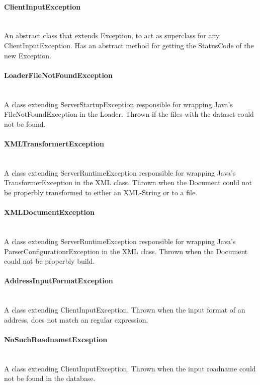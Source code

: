 \documentclass[a4paper,10pt,titlepage]{article}
\begin{document}
				\paragraph{ClientInputException}\mbox{}\\
An abstract class that extends Exception, to act as superclass for any ClientInputException. Has an abstract method for getting the StatusCode of the new Exception.

				\paragraph{LoaderFileNotFoundException}\mbox{}\\
A class extending ServerStartupException responsible for wrapping Java's FileNotFoundException in the Loader. Thrown if the files with the dataset could not be found.

				\paragraph{XMLTransformertException}\mbox{}\\
A class extending ServerRuntimeException responsible for wrapping Java's TransformerException in the XML class. Thrown when the Document could not be properbly transformed to either an XML-String or to a file.

				\paragraph{XMLDocumentException}\mbox{}\\
A class extending ServerRuntimeException responsible for wrapping Java's ParserConfigurationrException in the XML class. Thrown when the Document could not be properbly build.
				
				\paragraph{AddressInputFormatException}\mbox{}\\
A class extending ClientInputException. Thrown when the input format of an address, does not match an regular expression.

				\paragraph{NoSuchRoadnametException}\mbox{}\\
A class extending ClientInputException. Thrown when the input roadname could not be found in the database.
				
\end{document}
